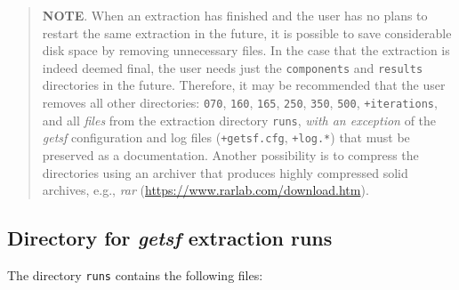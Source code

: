 \documentclass[a4paper,10pt]{article}
\begin{document}
\begin{quote} %
\textbf{NOTE}. When an extraction has finished and the user has no plans to restart the same extraction in the future, it is
possible to save considerable disk space by removing unnecessary files. In the case that the extraction is indeed deemed final, the
user needs just the \texttt{components} and \verb!results! directories in the future. Therefore, it may be recommended that the
user removes all other directories: \verb!070!, \verb!160!, \verb!165!, \verb!250!, \verb!350!, \verb!500!, \verb!+iterations!, and
all \emph{files} from the extraction directory \verb!runs!, \emph{with an exception} of the \textsl{getsf} configuration and log
files (\verb!+getsf.cfg!, \verb!+log.*!) that must be preserved as a documentation. Another possibility is to compress the
directories using an archiver that produces highly compressed solid archives, e.g., \textsl{rar}
(\url{https://www.rarlab.com/download.htm}).
\end{quote} %


\subsection{Directory for \textsl{getsf} extraction runs}
\label{extractdir}

The directory \verb!runs! contains the following files:\\
\end{document}

